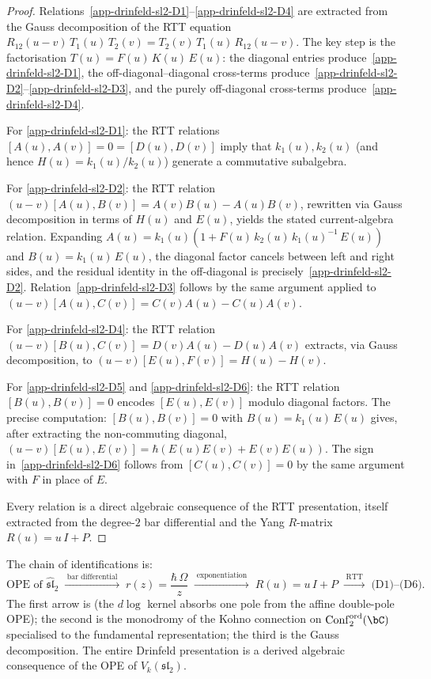 \begin{proof}
Relations~\ref{app-drinfeld-sl2-D1}--\ref{app-drinfeld-sl2-D4} are extracted from the Gauss
decomposition of the RTT equation
$R_{12}(u{-}v)\,T_1(u)\,T_2(v) = T_2(v)\,T_1(u)\,R_{12}(u{-}v)$.
The key step is the factorisation $T(u) = F(u)\,K(u)\,E(u)$: the
diagonal entries produce~\ref{app-drinfeld-sl2-D1}, the off-diagonal--diagonal
cross-terms produce~\ref{app-drinfeld-sl2-D2}--\ref{app-drinfeld-sl2-D3}, and the purely off-diagonal
cross-terms produce~\ref{app-drinfeld-sl2-D4}.

For \ref{app-drinfeld-sl2-D1}: the RTT relations $[A(u),A(v)] = 0 = [D(u),D(v)]$
imply that $k_1(u),k_2(u)$ (and hence $H(u) = k_1(u)/k_2(u)$)
generate a commutative subalgebra.

For \ref{app-drinfeld-sl2-D2}: the RTT relation
$(u{-}v)[A(u),B(v)] = A(v)B(u) - A(u)B(v)$, rewritten via Gauss
decomposition in terms of $H(u)$ and $E(u)$, yields the stated
current-algebra relation. Expanding
$A(u) = k_1(u)(1 + F(u)\,k_2(u)\,k_1(u)^{-1}\,E(u))$ and
$B(u) = k_1(u)\,E(u)$,
the diagonal factor cancels between left and right sides, and the
residual identity in the off-diagonal is precisely~\ref{app-drinfeld-sl2-D2}.
Relation~\ref{app-drinfeld-sl2-D3} follows by the same argument applied to
$(u{-}v)[A(u),C(v)] = C(v)A(u) - C(u)A(v)$.

For \ref{app-drinfeld-sl2-D4}: the RTT relation
$(u{-}v)[B(u),C(v)] = D(v)A(u) - D(u)A(v)$
extracts, via Gauss decomposition, to
$(u{-}v)[E(u),F(v)] = H(u) - H(v)$.

For \ref{app-drinfeld-sl2-D5} and \ref{app-drinfeld-sl2-D6}: the RTT relation $[B(u),B(v)] = 0$
encodes $[E(u),E(v)]$ modulo diagonal factors. The
precise computation: $[B(u),B(v)] = 0$ with $B(u) = k_1(u)\,E(u)$
gives, after extracting the non-commuting diagonal,
$(u{-}v)[E(u),E(v)] = \hbar(E(u)E(v) + E(v)E(u))$.
The sign in~\ref{app-drinfeld-sl2-D6} follows from $[C(u),C(v)] = 0$ by the same
argument with $F$ in place of $E$.

Every relation is a direct algebraic consequence of the RTT
presentation, itself extracted from the degree-$2$ bar differential
and the Yang $R$-matrix $R(u) = u\,I + P$.
\end{proof}

\begin{remark}
\label{rem:drinfeld-bar-provenance}
The chain of identifications is:
\[
\text{OPE of } \widehat{\mathfrak{sl}}_2
\;\xrightarrow{\;\text{bar differential}\;}\;
r(z) = \frac{\hbar\,\Omega}{z}
\;\xrightarrow{\;\text{exponentiation}\;}\;
R(u) = u\,I + P
\;\xrightarrow{\;\text{RTT}\;}\;
\text{(D1)--(D6)}.
\]
The first arrow is (the $d\log$ kernel absorbs one pole from the
affine double-pole OPE); the second is the monodromy of the Kohno
connection on $\mathrm{Conf}_2^{\mathrm{ord}}(\bC)$ specialised to the
fundamental representation; the third is the Gauss decomposition. The
entire Drinfeld presentation is a derived algebraic consequence of the
OPE of $V_k(\mathfrak{sl}_2)$.
\end{remark}

